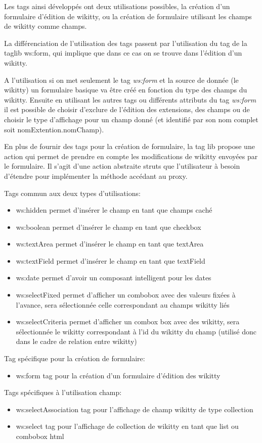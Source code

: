 Les tags ainsi développés ont deux utilisations possibles, la création d'un 
formulaire d'édition de wikitty, ou la création de formulaire utilisant les 
champs de wikitty comme champs. 

La différenciation de l'utilisation des tags passent par l'utilisation du tag 
de la taglib ws:form, qui implique que dans ce cas on se trouve dans l'édition d'un
wikitty.

A l'utilisation si on met seulement le tag \emph{ws:form} et la source de donnée 
(le wikitty) un formulaire basique va être créé en fonction du type des champs
du wikitty. Ensuite en utilisant les autres tags ou différents attributs du tag 
\emph{ws:form} il est possible de choisir d'exclure de l'édition des extensions,
des champs ou de choisir le type d'affichage pour un champ donné (et identifié
par son nom complet soit nomExtention.nomChamp).

En plus de fournir des tags pour la création de formulaire, la tag lib propose 
une action qui permet de prendre en compte les modifications de wikitty envoyées
par le formulaire. Il s'agit d'une action abstraite struts que l'utilisateur à 
besoin d'étendre pour implémenter la méthode accédant au proxy.

Tags commun aux deux types d'utilisations:
\begin{itemize}
\item ws:hidden permet d'insérer le champ en tant que champs caché
\item ws:boolean permet d'insérer le champ en tant que checkbox 
\item ws:textArea permet d'insérer le champ en tant que textArea
\item ws:textField permet d'insérer le champ en tant que textField
\item ws:date permet d'avoir un composant intelligent pour les dates 
\item ws:selectFixed permet d'afficher un combobox avec des valeurs fixées à 
l'avance, sera sélectionnée celle correspondant au champs wikitty liés
\item ws:selectCriteria permet d'afficher un combox box avec des wikitty, 
sera sélectionnée le wikitty correspondant à l'id du wikitty du champ
(utilisé donc dans le cadre de relation entre wikitty)\\
\end{itemize}

Tag spécifique pour la création de formulaire:
\begin{itemize}
\item ws:form tag pour la création d'un formulaire d'édition des wikitty \\
\end{itemize}

Tags spécifiques à l'utilisation champ:
\begin{itemize}
\item ws:selectAssociation tag pour l'affichage de champ wikitty de type collection
\item ws:select tag pour l'affichage de collection de wikitty en tant que list ou combobox html
\end{itemize}



